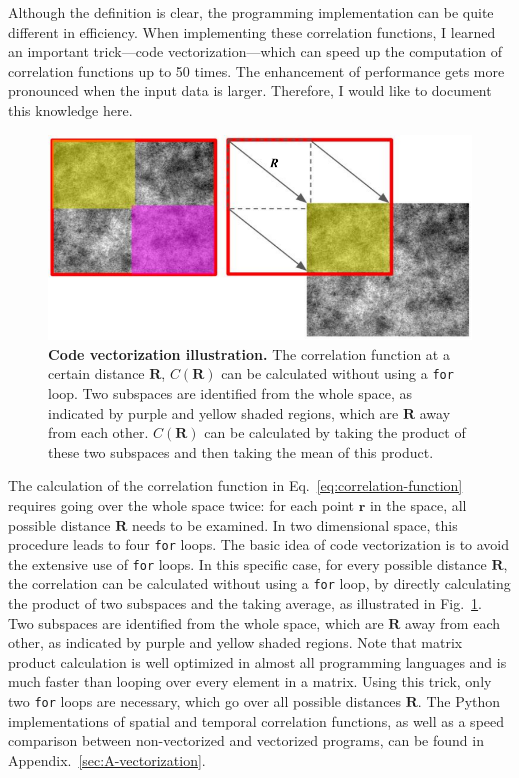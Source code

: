 Although the definition is clear, the programming implementation can be quite different in efficiency. When implementing these correlation functions, I learned an important trick---code vectorization---which can speed up the computation of correlation functions up to 50 times. The enhancement of performance gets more pronounced when the input data is larger. Therefore, I would like to document this knowledge here.


\begin{figure}[!ht]
	\begin{center}
	\includegraphics[width=5.5in]{Figs/2-Exp/vectorization.pdf}
	\end{center}
	\caption[Code Vectorization Illustration]
	{
	\textbf{Code vectorization illustration.}
	The correlation function at a certain distance $\bm{R}$, $C(\bm{R})$ can be calculated without using a \texttt{for} loop. Two subspaces are identified from the whole space, as indicated by purple and yellow shaded regions, which are $\bm{R}$ away from each other. $C(\bm{R})$ can be calculated by taking the product of these two subspaces and then taking the mean of this product.
	}
	\label{fig:vectorization}
\end{figure}


The calculation of the correlation function in Eq.~\ref{eq:correlation-function} requires going over the whole space twice: for each point $\bm{r}$ in the space, all possible distance $\bm{R}$ needs to be examined. In two dimensional space, this procedure leads to four \texttt{for} loops. The basic idea of code vectorization is to avoid the extensive use of \texttt{for} loops. In this specific case, for every possible distance $\bm{R}$, the correlation can be calculated without using a \texttt{for} loop, by directly calculating the product of two subspaces and the taking average, as illustrated in Fig.~\ref{fig:vectorization}. Two subspaces are identified from the whole space, which are $\bm{R}$ away from each other, as indicated by purple and yellow shaded regions. Note that matrix product calculation is well optimized in almost all programming languages and is much faster than looping over every element in a matrix. Using this trick, only two \texttt{for} loops are necessary, which go over all possible distances $\bm{R}$. The Python implementations of spatial and temporal correlation functions, as well as a speed comparison between non-vectorized and vectorized programs, can be found in Appendix.~\ref{sec:A-vectorization}.

